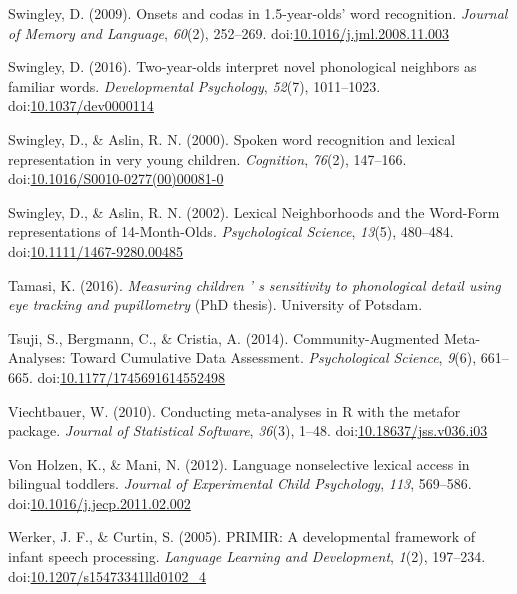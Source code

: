 \documentclass[
  man, noextraspace]{apa6}
\begin{document}
\leavevmode\hypertarget{ref-Swingley2009}{}%
Swingley, D. (2009). Onsets and codas in 1.5-year-olds' word recognition. \emph{Journal of Memory and Language}, \emph{60}(2), 252--269. doi:\href{https://doi.org/10.1016/j.jml.2008.11.003}{10.1016/j.jml.2008.11.003}

\leavevmode\hypertarget{ref-Swingley2016}{}%
Swingley, D. (2016). Two-year-olds interpret novel phonological neighbors as familiar words. \emph{Developmental Psychology}, \emph{52}(7), 1011--1023. doi:\href{https://doi.org/10.1037/dev0000114}{10.1037/dev0000114}

\leavevmode\hypertarget{ref-Swingley2000}{}%
Swingley, D., \& Aslin, R. N. (2000). Spoken word recognition and lexical representation in very young children. \emph{Cognition}, \emph{76}(2), 147--166. doi:\href{https://doi.org/10.1016/S0010-0277(00)00081-0}{10.1016/S0010-0277(00)00081-0}

\leavevmode\hypertarget{ref-Swingley2002}{}%
Swingley, D., \& Aslin, R. N. (2002). Lexical Neighborhoods and the Word-Form representations of 14-Month-Olds. \emph{Psychological Science}, \emph{13}(5), 480--484. doi:\href{https://doi.org/10.1111/1467-9280.00485}{10.1111/1467-9280.00485}

\leavevmode\hypertarget{ref-Tamasi2016}{}%
Tamasi, K. (2016). \emph{Measuring children ' s sensitivity to phonological detail using eye tracking and pupillometry} (PhD thesis). University of Potsdam.

\leavevmode\hypertarget{ref-Tsuji2014}{}%
Tsuji, S., Bergmann, C., \& Cristia, A. (2014). Community-Augmented Meta-Analyses: Toward Cumulative Data Assessment. \emph{Psychological Science}, \emph{9}(6), 661--665. doi:\href{https://doi.org/10.1177/1745691614552498}{10.1177/1745691614552498}

\leavevmode\hypertarget{ref-metafor}{}%
Viechtbauer, W. (2010). Conducting meta-analyses in R with the metafor package. \emph{Journal of Statistical Software}, \emph{36}(3), 1--48. doi:\href{https://doi.org/10.18637/jss.v036.i03}{10.18637/jss.v036.i03}

\leavevmode\hypertarget{ref-VonHolzen2012}{}%
Von Holzen, K., \& Mani, N. (2012). Language nonselective lexical access in bilingual toddlers. \emph{Journal of Experimental Child Psychology}, \emph{113}, 569--586. doi:\href{https://doi.org/10.1016/j.jecp.2011.02.002}{10.1016/j.jecp.2011.02.002}

\leavevmode\hypertarget{ref-Werker2005}{}%
Werker, J. F., \& Curtin, S. (2005). PRIMIR: A developmental framework of infant speech processing. \emph{Language Learning and Development}, \emph{1}(2), 197--234. doi:\href{https://doi.org/10.1207/s15473341lld0102_4}{10.1207/s15473341lld0102\_4}
\end{document}
